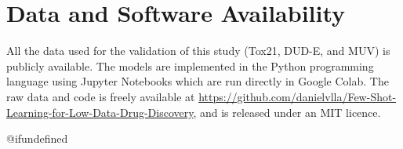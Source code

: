 \documentclass[journal=jcisd8,manuscript=article]{achemso} %
\newenvironment{datasoftware}{%
\section*{Data and Software Availability}%
}{}
\providecommand{\DIFadd}[1]{{\protect\color{blue}\uwave{#1}}} %
\providecommand{\DIFaddbegin}{} %
\providecommand{\DIFdelbegin}{} %
\providecommand{\DIFdelend}{} %
\begin{document}
\begin{datasoftware}

All the data used for the validation of this study (Tox21, DUD-E, and MUV) is publicly available.  The models are implemented in the Python programming language using Jupyter Notebooks which are run directly in Google Colab.  The raw data and code is freely available at \url{https://github.com/danielvlla/Few-Shot-Learning-for-Low-Data-Drug-Discovery}, and is released under an MIT licence.

\end{datasoftware}

\DIFdelbegin %
\DIFdelend \DIFaddbegin \providecommand{\latin}[1]{#1}
\makeatletter
\providecommand{\doi}
  {\begingroup\let\do\@makeother\dospecials
  \catcode\DIFadd{`\{=1 }\catcode\DIFadd{`\}=2 }\doi@aux}
\providecommand{\doi@aux}[1]{\endgroup\texttt{#1}}
\makeatother
\providecommand*\mcitethebibliography{\thebibliography}
\csname @ifundefined
{\let\endmcitethebibliography\endthebibliography}{}
\end{document}
